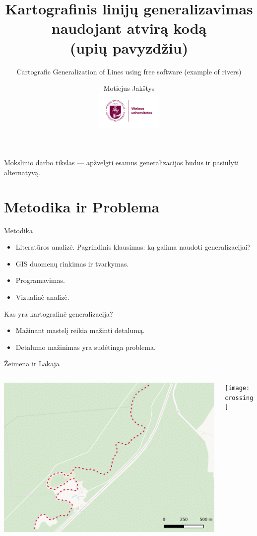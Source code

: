 \documentclass[14pt]{beamer}
\title{
    Kartografinis linijų generalizavimas naudojant atvirą kodą \\
    (upių pavyzdžiu)
}
\subtitle{
    \vspace{2em}
    Cartografic Generalization of Lines using free software (example of rivers)
}
\author{Motiejus Jakštys \\
    \includegraphics[height=5em]{../../misc/Logo_vilniaus_universitetas}
}
\newcommand{\twocols}[2]
{
    \begin{columns}[c]
        \begin{column}{0.5\textwidth}
            #1
        \end{column}
        \hspace{0pt} \vrule{}
        \begin{column}{0.5\textwidth}
            #2
        \end{column}
    \end{columns}
}
\begin{document}

\begin{frame}
\titlepage
\end{frame}

\begin{frame}
    Mokslinio darbo tikslas --- apžvelgti esamus generalizacijos būdus ir pasiūlyti
      alternatyvą.
\end{frame}

\section{Metodika ir Problema}

\begin{frame}{Metodika}
    \begin{itemize}[<+->]
        \item Literatūros analizė. Pagrindinis klausimas: ką galima naudoti
            generalizacijai?
        \item GIS duomenų rinkimas ir tvarkymas.
        \item Programavimas.
        \item Vizualinė analizė.
    \end{itemize}
\end{frame}

\begin{frame}{Kas yra kartografinė generalizacija?}
    \begin{itemize}[<+->]
        \item Mažinant mastelį reikia mažinti detalumą.
        \item Detalumo mažinimas yra sudėtinga problema.
    \end{itemize}
\end{frame}

\begin{frame}{Žeimena ir Lakaja}
    \twocols
    {\includegraphics[width=\textwidth]{zeimena}}
    {\texttt{[image: crossing]}}
\end{frame}
\end{document}

